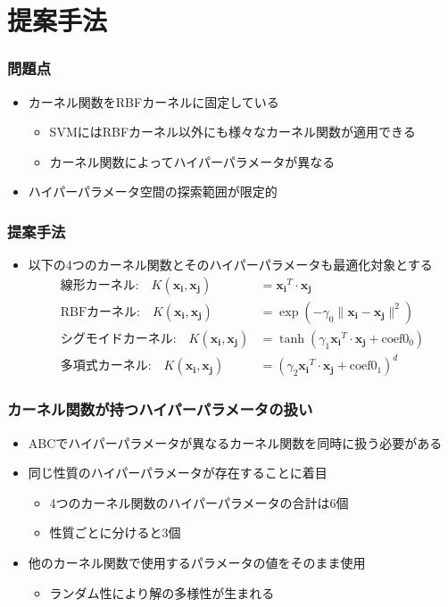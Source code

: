\documentclass[11pt,dvipdfmx,cjk]{beamer}
\begin{document}
\section{提案手法}
  \begin{frame}
    \frametitle{問題点}
    \begin{itemize}
      \item カーネル関数をRBFカーネルに固定している
      \begin{itemize}
       \item SVMにはRBFカーネル以外にも様々なカーネル関数が適用できる      
      \item カーネル関数によってハイパーパラメータが異なる
    \end{itemize}
    \item ハイパーパラメータ空間の探索範囲が限定的
  \end{itemize}
\end{frame}
  
  \begin{frame}
    \frametitle{提案手法}
    \begin{itemize}
      \item 以下の4つのカーネル関数とそのハイパーパラメータも最適化対象とする 
      \begin{align*}
        \text{線形カーネル:} \quad K(\boldsymbol{x_i}, \boldsymbol{x_j}) &= \boldsymbol{x_i}^T \cdot \boldsymbol{x_j} \\
        \text{RBFカーネル:} \quad K(\boldsymbol{x_i}, \boldsymbol{x_j}) &= \exp\left(-\gamma_0 \| \boldsymbol{x_i} - \boldsymbol{x_j} \|^2\right) \\
        \text{シグモイドカーネル:} \quad K(\boldsymbol{x_i}, \boldsymbol{x_j}) &= \tanh(\gamma_1 \boldsymbol{x_i}^T \cdot \boldsymbol{x_j} + \text{coef0}_0) \\
        \text{多項式カーネル:} \quad K(\boldsymbol{x_i}, \boldsymbol{x_j}) &= (\gamma_2\boldsymbol{x_i}^T \cdot \boldsymbol{x_j} + \text{coef0}_1)^d
       \end{align*}
    \end{itemize}
  \end{frame}


\begin{frame}
  \frametitle{カーネル関数が持つハイパーパラメータの扱い}
  \begin{itemize}
  \item ABCでハイパーパラメータが異なるカーネル関数を同時に扱う必要がある
  \item  同じ性質のハイパーパラメータが存在することに着目
      \begin{itemize}
      \item 4つのカーネル関数のハイパーパラメータの合計は6個
      \item 性質ごとに分けると3個
     \end{itemize}
  \item  他のカーネル関数で使用するパラメータの値をそのまま使用
     \begin{itemize}
     \item  ランダム性により解の多様性が生まれる
    \end{itemize}
  \end{itemize}
\end{frame}
\end{document}
